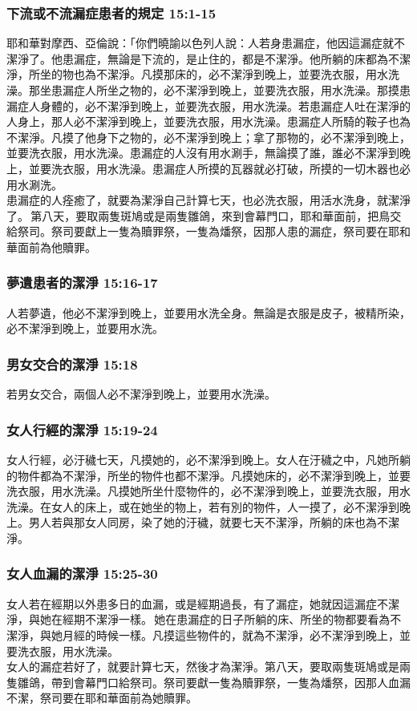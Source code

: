 \subsubsection{下流或不流漏症患者的規定 15:1-15}
耶和華對摩西、亞倫說：「你們曉諭以色列人說：人若身患漏症，他因這漏症就不潔淨了。他患漏症，無論是下流的，是止住的，都是不潔淨。他所躺的床都為不潔淨，所坐的物也為不潔淨。凡摸那床的，必不潔淨到晚上，並要洗衣服，用水洗澡。那坐患漏症人所坐之物的，必不潔淨到晚上，並要洗衣服，用水洗澡。那摸患漏症人身體的，必不潔淨到晚上，並要洗衣服，用水洗澡。若患漏症人吐在潔淨的人身上，那人必不潔淨到晚上，並要洗衣服，用水洗澡。患漏症人所騎的鞍子也為不潔淨。凡摸了他身下之物的，必不潔淨到晚上；拿了那物的，必不潔淨到晚上，並要洗衣服，用水洗澡。患漏症的人沒有用水涮手，無論摸了誰，誰必不潔淨到晚上，並要洗衣服，用水洗澡。患漏症人所摸的瓦器就必打破，所摸的一切木器也必用水涮洗。\\
患漏症的人痊癒了，就要為潔淨自己計算七天，也必洗衣服，用活水洗身，就潔淨了。 第八天，要取兩隻斑鳩或是兩隻雛鴿，來到會幕門口，耶和華面前，把鳥交給祭司。祭司要獻上一隻為贖罪祭，一隻為燔祭，因那人患的漏症，祭司要在耶和華面前為他贖罪。

\subsubsection{夢遺患者的潔淨 15:16-17}
人若夢遺，他必不潔淨到晚上，並要用水洗全身。無論是衣服是皮子，被精所染，必不潔淨到晚上，並要用水洗。 

\subsubsection{男女交合的潔淨 15:18}
若男女交合，兩個人必不潔淨到晚上，並要用水洗澡。

\subsubsection{女人行經的潔淨 15:19-24}
女人行經，必汙穢七天，凡摸她的，必不潔淨到晚上。女人在汙穢之中，凡她所躺的物件都為不潔淨，所坐的物件也都不潔淨。凡摸她床的，必不潔淨到晚上，並要洗衣服，用水洗澡。凡摸她所坐什麼物件的，必不潔淨到晚上，並要洗衣服，用水洗澡。在女人的床上，或在她坐的物上，若有別的物件，人一摸了，必不潔淨到晚上。男人若與那女人同房，染了她的汙穢，就要七天不潔淨，所躺的床也為不潔淨。

\subsubsection{女人血漏的潔淨 15:25-30}
女人若在經期以外患多日的血漏，或是經期過長，有了漏症，她就因這漏症不潔淨，與她在經期不潔淨一樣。 她在患漏症的日子所躺的床、所坐的物都要看為不潔淨，與她月經的時候一樣。凡摸這些物件的，就為不潔淨，必不潔淨到晚上，並要洗衣服，用水洗澡。\\
女人的漏症若好了，就要計算七天，然後才為潔淨。第八天，要取兩隻斑鳩或是兩隻雛鴿，帶到會幕門口給祭司。祭司要獻一隻為贖罪祭，一隻為燔祭，因那人血漏不潔，祭司要在耶和華面前為她贖罪。

